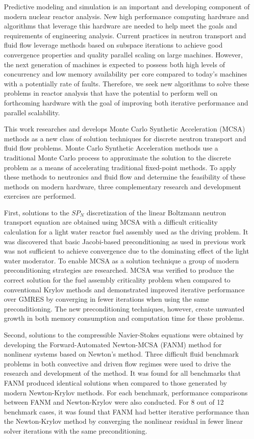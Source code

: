 Predictive modeling and simulation is an important and developing
component of modern nuclear reactor analysis. New high performance
computing hardware and algorithms that leverage this hardware are
needed to help meet the goals and requirements of engineering
analysis. Current practices in neutron transport and fluid flow
leverage methods based on subspace iterations to achieve good
convergence properties and quality parallel scaling on large
machines. However, the next generation of machines is expected to
possess both high levels of concurrency and low memory availability
per core compared to today's machines with a potentially rate of
faults. Therefore, we seek new algorithms to solve these problems in
reactor analysis that have the potential to perform well on
forthcoming hardware with the goal of improving both iterative
performance and parallel scalability.

This work researches and develops Monte Carlo Synthetic Acceleration
(MCSA) methods as a new class of solution techniques for discrete
neutron transport and fluid flow problems. Monte Carlo Synthetic
Acceleration methods use a traditional Monte Carlo process to
approximate the solution to the discrete problem as a means of
accelerating traditional fixed-point methods. To apply these methods
to neutronics and fluid flow and determine the feasibility of these
methods on modern hardware, three complementary research and
development exercises are performed.

First, solutions to the $SP_N$ discretization of the linear Boltzmann
neutron transport equation are obtained using MCSA with a difficult
criticality calculation for a light water reactor fuel assembly used
as the driving problem. It was discovered that basic Jacobi-based
preconditioning as used in previous work was not sufficient to achieve
convergence due to the dominating effect of the light water
moderator. To enable MCSA as a solution technique a group of modern
preconditioning strategies are researched. MCSA was verified to
produce the correct solution for the fuel assembly criticality problem
when compared to conventional Krylov methods and demonstrated improved
iterative performance over GMRES by converging in fewer iterations
when using the same preconditioning. The new preconditioning
techniques, however, create unwanted growth in both memory consumption
and computation time for these problems.

Second, solutions to the compressible Navier-Stokes equations were
obtained by developing the Forward-Automated Newton-MCSA (FANM) method
for nonlinear systems based on Newton's method. Three difficult fluid
benchmark problems in both convective and driven flow regimes were
used to drive the research and development of the method. It was found
for all benchmarks that FANM produced identical solutions when
compared to those generated by modern Newton-Krylov methods. For each
benchmark, performance comparisons between FANM and Newton-Krylov were
also conducted. For 8 out of 12 benchmark cases, it was found that
FANM had better iterative performance than the Newton-Krylov method by
converging the nonlinear residual in fewer linear solver iterations
with the same preconditioning.


